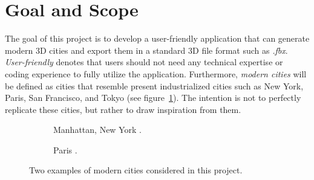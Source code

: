 \section{Goal and Scope}

The goal of this project is to develop a user-friendly application that can generate modern 3D cities and export them in a standard 3D file format such as \textit{.fbx}.
\textit{User-friendly} denotes that users should not need any technical expertise or coding experience to fully utilize the application.
Furthermore, \textit{modern cities} will be defined as cities that resemble present industrialized cities such as New York, Paris, San Francisco, and Tokyo (see figure~\ref{fig:ModernCities}).
The intention is not to perfectly replicate these cities, but rather to draw inspiration from them.

\begin{figure}[h!]
  \centering

  \begin{subfigure}[b]{0.56\textwidth}
    \caption{Manhattan, New York \cite{manhattan_img}.}
  \end{subfigure}
  \quad
  \begin{subfigure}[b]{0.395\textwidth}
    \caption{Paris \cite{paris_img}.}
  \end{subfigure}

  \caption{Two examples of modern cities considered in this project.}
  \label{fig:ModernCities}
\end{figure}

